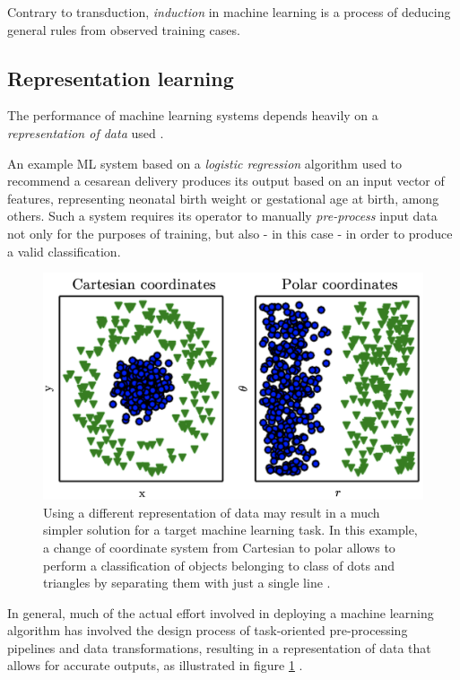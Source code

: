 
Contrary to transduction, \emph{induction} in machine learning is a process of deducing general rules from observed training cases.

\subsection{Representation learning}

The performance of machine learning systems depends heavily on a \emph{representation of data} used \cite{bengio2012representation}.

An example ML system based on a \emph{logistic regression} algorithm \cite{logreg_caesarian} used to recommend a cesarean delivery produces its output based on an input vector of features, representing neonatal birth weight or gestational age at birth, among others. Such a system requires its operator to manually \emph{pre-process} input data not only for the purposes of training, but also - in this case - in order to produce a valid classification. 

\begin{figure}[]
\centering
\includegraphics[scale=0.3]{figures/representation.png}
\caption{Using a different representation of data may result in a much simpler solution for a target machine learning task. In this example, a change of coordinate system from Cartesian to polar allows to perform a classification of objects belonging to class of dots and triangles by separating them with just a single line \cite{goodfellow}.}
\label{representation:cartesianvpolar}
\end{figure}

In general, much of the actual effort involved in deploying a machine learning algorithm has involved the design process of task-oriented pre-processing pipelines and data transformations, resulting in a representation of data that allows for accurate outputs, as illustrated in figure \ref{representation:cartesianvpolar} \cite{bengio2012representation}.

